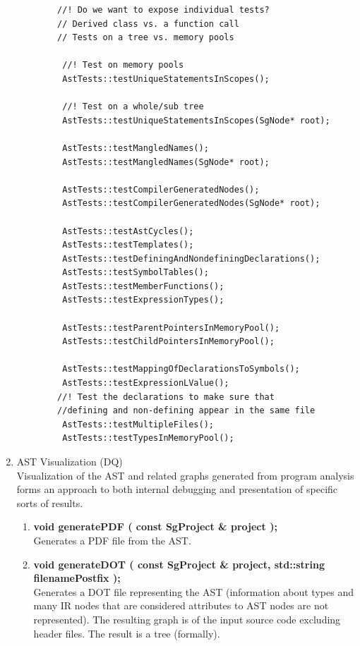 \begin{enumerate}
\begin{lstlisting}
        //! Do we want to expose individual tests?
        // Derived class vs. a function call 
        // Tests on a tree vs. memory pools
       
         //! Test on memory pools
         AstTests::testUniqueStatementsInScopes(); 

         //! Test on a whole/sub tree
         AstTests::testUniqueStatementsInScopes(SgNode* root); 

         AstTests::testMangledNames();
         AstTests::testMangledNames(SgNode* root);

         AstTests::testCompilerGeneratedNodes();
         AstTests::testCompilerGeneratedNodes(SgNode* root);

         AstTests::testAstCycles();
         AstTests::testTemplates();
         AstTests::testDefiningAndNondefiningDeclarations();
         AstTests::testSymbolTables();
         AstTests::testMemberFunctions();
         AstTests::testExpressionTypes();

         AstTests::testParentPointersInMemoryPool();
         AstTests::testChildPointersInMemoryPool();

         AstTests::testMappingOfDeclarationsToSymbols();
         AstTests::testExpressionLValue();
        //! Test the declarations to make sure that 
        //defining and non-defining appear in the same file
         AstTests::testMultipleFiles();
         AstTests::testTypesInMemoryPool();
         \end{lstlisting}


   \item AST Visualization (DQ) \\
         Visualization of the AST and related graphs generated from program analysis forms
         an approach to both internal debugging and presentation of specific sorts of
         results.
   \begin{enumerate}
      \item {\bf void generatePDF ( const SgProject \& project );} \\
      Generates a PDF file from the AST.

      \item {\bf void generateDOT ( const SgProject \& project, std::string filenamePostfix );} \\
      Generates a DOT file representing the AST (information about types and many IR nodes
      that are considered attributes to AST nodes are not represented).
      The resulting graph is of the input source code excluding header files.
      The result is a tree (formally).


\end{enumerate}
\end{enumerate}
